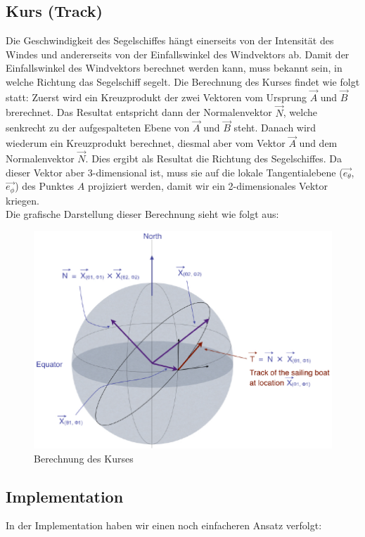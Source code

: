 \subsection{Kurs (Track)}
Die Geschwindigkeit des Segelschiffes hängt einerseits von der Intensität des Windes und andererseits von der Einfallswinkel des Windvektors ab. Damit der Einfallswinkel des Windvektors berechnet werden kann, muss bekannt sein, in welche Richtung das Segelschiff segelt. Die Berechnung des Kurses findet wie folgt statt: Zuerst wird ein Kreuzprodukt der zwei Vektoren vom Ursprung  \(\overrightarrow{A}\) und \(\overrightarrow{B}\) brerechnet. Das Resultat entspricht dann der Normalenvektor \(\overrightarrow{N}\), welche senkrecht zu der aufgespalteten Ebene von \(\overrightarrow{A}\) und \(\overrightarrow{B}\) steht. Danach wird wiederum ein Kreuzprodukt berechnet, diesmal aber vom Vektor \(\overrightarrow{A}\) und dem Normalenvektor \(\overrightarrow{N}\). Dies ergibt als Resultat die Richtung des Segelschiffes. Da dieser Vektor aber 3-dimensional ist, muss sie auf die lokale Tangentialebene (\(\overrightarrow{e_{\theta}}\), \(\overrightarrow{e_{\phi}}\)) des Punktes $A$ projiziert werden, damit wir ein 2-dimensionales Vektor kriegen. \\
Die grafische Darstellung dieser Berechnung sieht wie folgt aus:
\begin{figure}[h!]
\centering
\includegraphics[width=0.8\linewidth]{img/track}
\caption{Berechnung des Kurses}
\label{gridnetConn}
\end{figure}

\subsection{Implementation}
In der Implementation haben wir einen noch einfacheren Ansatz verfolgt:

